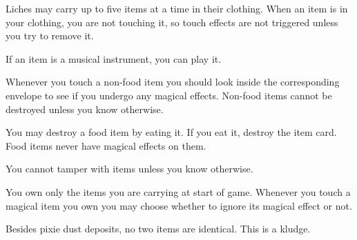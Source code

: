 \documentclass[green]{Sel}
\begin{document}
\name{\gItems{}}
Liches may carry up to five items at a time in their clothing. When an item is in your clothing, you are not touching it, so touch effects are not triggered unless you try to remove it.

If an item is a musical instrument, you can play it. 

Whenever you touch a non-food item you should look inside the corresponding envelope to see if you undergo any magical effects. Non-food items cannot be destroyed unless you know otherwise.

You may destroy a food item by eating it. If you eat it, destroy the item card. Food items never have magical effects on them.

You cannot tamper with items unless you know otherwise.

You own only the items you are carrying at start of game. Whenever you touch a magical item you own you may choose whether to ignore its magical effect or not.

Besides pixie dust deposits, no two items are identical. This is a kludge.
\end{document}
